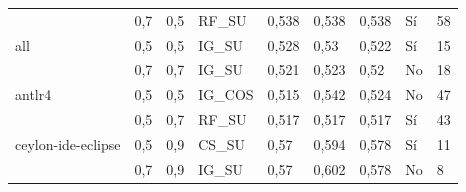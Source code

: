 \begin{table}[H]
{{\begin{tabular}{lllllllll}
                                & 0,7                               & 0,5                            & RF\_SU                                      & 0,538                                  & 0,538                               & 0,538                                 & Sí                               & 58                                        \\
all                                  & 0,5                               & 0,5                            & IG\_SU                                      & 0,528                                  & 0,53                                & 0,522                                 & Sí                               & 15                                        \\
                                  & 0,7                               & 0,7                            & IG\_SU                                      & 0,521                                  & 0,523                               & 0,52                                  & No                                   & 18                                        \\
antlr4                               & 0,5                               & 0,5                            & IG\_COS                                     & 0,515                                  & 0,542                               & 0,524                                 & No                                   & 47                                        \\
                               & 0,5                               & 0,7                            & RF\_SU                                      & 0,517                                  & 0,517                               & 0,517                                 & Sí                               & 43                                        \\
ceylon-ide-eclipse                   & 0,5                               & 0,9                            & CS\_SU                                      & 0,57                                   & 0,594                               & 0,578                                 & Sí                               & 11                                        \\
                   & 0,7                               & 0,9                            & IG\_SU                                      & 0,57                                   & 0,602                               & 0,578                                 & No                                   & 8                                         \\

\end{tabular}}}
\end{table}
